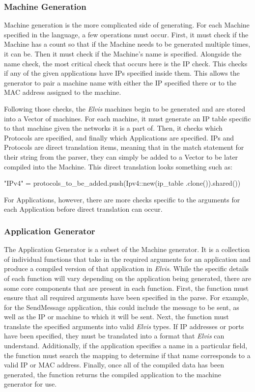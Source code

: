 \documentclass[journal]{IEEEtran} %
\newcommand{\elvis}{\textit{Elvis}}
\begin{document}
\subsubsection{Machine Generation}
Machine generation is the more complicated side of generating. For each Machine specified in the language, a few operations must occur. First, it must check if the Machine has a count so that if the Machine needs to be generated multiple times, it can be. Then it must check if the Machine's name is specified. Alongside the name check, the most critical check that occurs here is the IP check. This checks if any of the given applications have IPs specified inside them. This allows the generator to pair a machine name with either the IP specified there or to the MAC address assigned to the machine. 

Following those checks, the \elvis{} machines begin to be generated and are stored into a Vector of machines. For each machine, it must generate an IP table specific to that machine given the networks it is a part of. Then, it checks which Protocols are specified, and finally which Applications are specified. IPs and Protocols are direct translation items, meaning that in the match statement for their string from the parser, they can simply be added to a Vector to be later compiled into the Machine. This direct translation looks something such as:

"IPv4" =\> protocols\_to\_be\_added.push(Ipv4::new(ip\_table
.clone()).shared())

For Applications, however, there are more checks specific to the arguments for each Application before direct translation can occur.

\subsubsection{Application Generator}

The Application Generator is a subset of the Machine generator. It is a collection of individual functions that take in the required arguments for an application and produce a compiled version of that application in \elvis{}. While the specific details of each function will vary depending on the application being generated, there are some core components that are present in each function. First, the function must ensure that all required arguments have been specified in the parse. For example, for the SendMessage application, this could include the message to be sent, as well as the IP or machine to which it will be sent. Next, the function must translate the specified arguments into valid \elvis{} types. If IP addresses or ports have been specified, they must be translated into a format that \elvis{} can understand. Additionally, if the application specifies a name in a particular field, the function must search the mapping to determine if that name corresponds to a valid IP or MAC address. Finally, once all of the compiled data has been generated, the function returns the compiled application to the machine generator for use.
\end{document}
